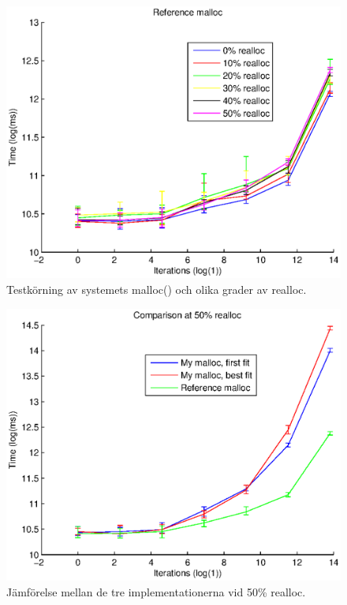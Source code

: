 \documentclass[10pt,a4paper]{article}
\begin{document}
\begin{figure}
\includegraphics[scale=0.7]{../results/ref.eps}
\caption{Testkörning av systemets malloc() och olika grader av realloc.}
\label{fig:stock}
\end{figure}

\begin{figure}
\includegraphics[scale=0.7]{../results/comparison.eps}
\caption{Jämförelse mellan de tre implementationerna vid 50\% realloc.}
\label{fig:comparison}
\end{figure}

\begin{lstlisting}

\end{lstlisting}
\end{document}
